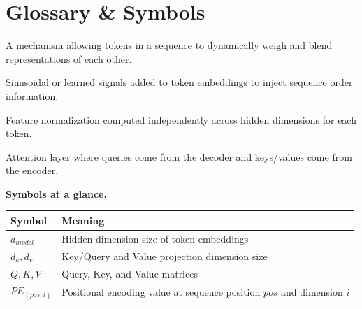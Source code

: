 \documentclass[a4paper,11pt]{article}
\begin{document}
\section*{Glossary \& Symbols}
\begin{description}[leftmargin=8.5em,style=nextline,font=\normalfont\bfseries\color{navy}]
  \item[Self-Attention] A mechanism allowing tokens in a sequence to dynamically weigh and blend representations of each other.
  \item[Positional Encoding] Sinusoidal or learned signals added to token embeddings to inject sequence order information.
  \item[Layer Normalization] Feature normalization computed independently across hidden dimensions for each token.
  \item[Cross-Attention] Attention layer where queries come from the decoder and keys/values come from the encoder.
\end{description}

\medskip
\noindent\textbf{Symbols at a glance.}
\begin{center}\small
\begin{tabular}{@{}ll@{}}
\toprule
\textbf{Symbol} & \textbf{Meaning} \\ \midrule
$d_{model}$ & Hidden dimension size of token embeddings \\
$d_k, d_v$ & Key/Query and Value projection dimension size \\
$Q, K, V$ & Query, Key, and Value matrices \\
$PE_{(pos, i)}$ & Positional encoding value at sequence position $pos$ and dimension $i$ \\
\bottomrule
\end{tabular}
\end{center}
\end{document}
